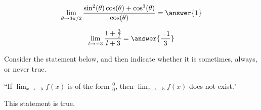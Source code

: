\documentclass[handout]{ximera}
\begin{document}
\begin{exercise}
\[\displaystyle\lim_{\theta \to 3\pi /2}\frac{\sin^2(\theta)\cos(\theta) + \cos^3(\theta)}{\cos(\theta)} = \answer{1}\]
\end{exercise}

\begin{exercise}
\[\lim_{l \to -3} \cfrac{1+\frac{3}{l}}{l+3} = \answer{\frac{-1}{3}}\]
\end{exercise}

\begin{exercise}

Consider the statement below, and then indicate whether it is sometimes, always, or never true.

\begin{center} ``If $\displaystyle\lim_{x \to -5} f(x)$ is of the form $\frac{0}{0}$, then $\displaystyle\lim_{x\to -5} f(x)$ does not exist." \end{center}

This statement is  true.

\end{exercise}
\end{document}

